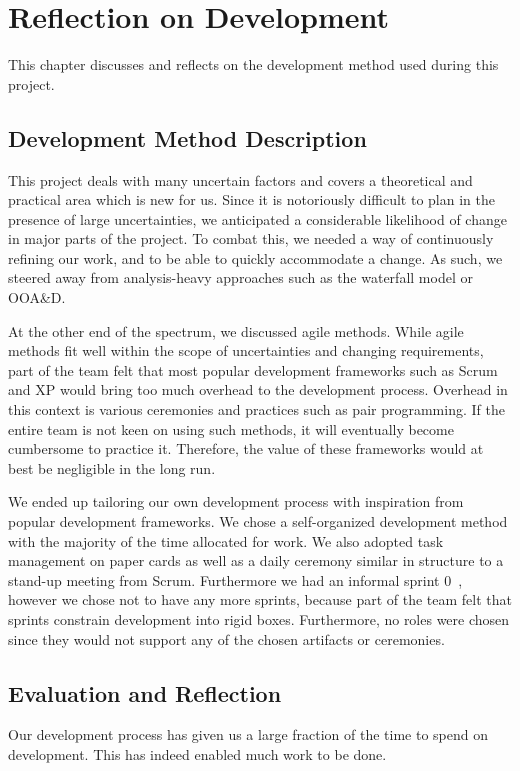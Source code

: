 \chapter{Reflection on Development}\label{chap:devmethodreflection}
This chapter discusses and reflects on the development method used during this project. 

\section{Development Method Description}
This project deals with many uncertain factors and covers a theoretical and practical area which is new for us. Since it is notoriously difficult to plan in the presence of large uncertainties, we anticipated a considerable likelihood of change in major parts of the project. To combat this, we needed a way of continuously refining our work, and to be able to quickly accommodate a change. As such, we steered away from analysis-heavy approaches such as the waterfall model or OOA\&D\@.

At the other end of the spectrum, we discussed agile methods. While agile methods fit well within the scope of uncertainties and changing requirements, part of the team felt that most popular development frameworks such as Scrum and XP would bring too much overhead to the development process. Overhead in this context is various ceremonies and practices such as pair programming. If the entire team is not keen on using such methods, it will eventually become cumbersome to practice it. Therefore, the value of these frameworks would at best be negligible in the long run.

We ended up tailoring our own development process with inspiration from popular development frameworks. We chose a self-organized development method with the majority of the time allocated for work. We also adopted task management on paper cards as well as a daily ceremony similar in structure to a stand-up meeting from Scrum. Furthermore we had an informal sprint 0~\cite{sprint-zero}, however we chose not to have any more sprints, because part of the team felt that sprints constrain development into rigid boxes. Furthermore, no roles were chosen since they would not support any of the chosen artifacts or ceremonies.

\section{Evaluation and Reflection}
Our development process has given us a large fraction of the time to spend on development. This has indeed enabled much work to be done. 

